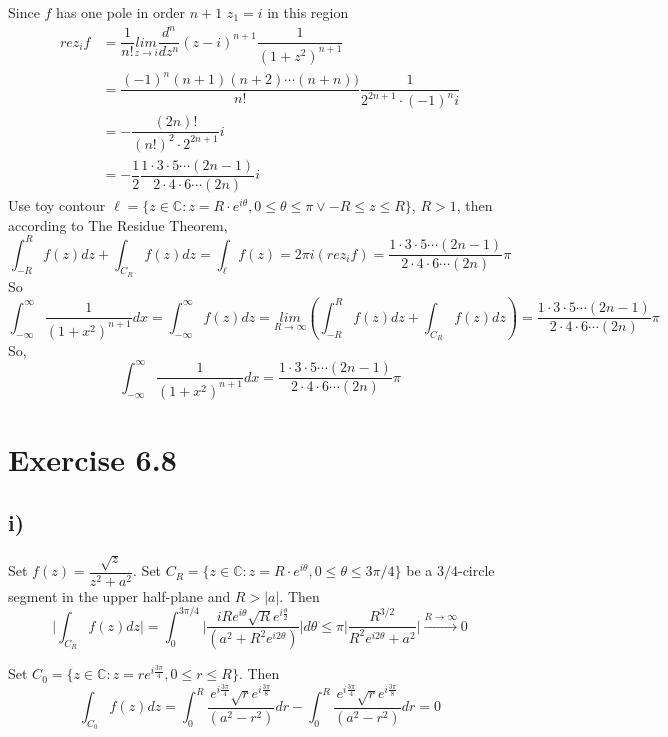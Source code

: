 \documentclass[a4paper,12pt,titlepage]{article}
\begin{document}
Since $f$ has one pole in order $n+1$ $z_1=i$ in this region
\begin{align*}
rez_{i}f&=\dfrac{1}{n!}\underset{z\rightarrow i}{lim}\dfrac{d^{n}}{dz^n}
(z-i)^{n+1}\dfrac{1}{(1+z^2)^{n+1}}\\
&=\dfrac{(-1)^{n}(n+1)(n+2)\cdots(n+n))}{n!}\dfrac{1}{2^{2n+1}\cdot(-1)^{n}i}\\
&=-\dfrac{(2n)!}{(n!)^2\cdot2^{2n+1}}i
\\
&=-\dfrac{1}{2}\dfrac{1\cdot3\cdot5\cdots(2n-1)}{2\cdot4\cdot6\cdots(2n)}i
\end{align*}
Use toy contour $\ell= \lbrace z \in \mathbb{C}: z = R\cdot e^{i\theta}, 0 \leqslant \theta \leqslant \pi \vee -R\leqslant z\leqslant R\rbrace$, $R>1$, then according to The Residue Theorem, 
$$\int_{-R}^Rf(z)dz+\int_{C_R}f(z)dz=\int_{\ell}f(z)=2\pi i(rez_{i}f)=\dfrac{1\cdot3\cdot5\cdots(2n-1)}{2\cdot4\cdot6\cdots(2n)}\pi$$
So
$$\int_{-\infty}^{\infty}\dfrac{1}{(1+x^2)^{n+1}}dx=\int_{-\infty}^{\infty}f(z)dz=\underset{R\rightarrow \infty}{lim}(\int_{-R}^Rf(z)dz+\int_{C_R}f(z)dz)=\dfrac{1\cdot3\cdot5\cdots(2n-1)}{2\cdot4\cdot6\cdots(2n)}\pi$$
So,
$$\int_{-\infty}^{\infty}\dfrac{1}{(1+x^2)^{n+1}}dx=\dfrac{1\cdot3\cdot5\cdots(2n-1)}{2\cdot4\cdot6\cdots(2n)}\pi
$$

\section*{Exercise 6.8}
\subsection*{i)}
Set $f(z)=\dfrac{\sqrt{z}}{z^2+a^2}$. 
Set $C_R = \lbrace z \in \mathbb{C}: z = R\cdot e^{i\theta}, 0 \leqslant \theta \leqslant 3\pi/4\rbrace$ be a $3/4$-circle segment in the upper half-plane and $R>|a|$.  Then
$$\Big|\int_{C_R}f(z)dz\Big|=\int_0^{3\pi/4}\Big|\dfrac{iRe^{i\theta}\sqrt{R}e^{i\frac{\theta}{2}}}{(a^2+R^2e^{i2\theta})}\Big|d\theta\leqslant\pi\Big|\dfrac{R^{3/2}}{R^2e^{i2\theta}+a^2}\Big|\xrightarrow{R\rightarrow\infty}0$$

Set $C_0 = \lbrace z \in \mathbb{C}: z = r e^{i\frac{3\pi}{4}}, 0 \leqslant r\leqslant R\rbrace$.  Then
$$\int_{C_0}f(z)dz=\int_0^{R}\dfrac{e^{i\frac{3\pi}{4}}\sqrt{r}e^{i\frac{3\pi}{8}}}{(a^2-r^2)}dr-\int_0^{R}\dfrac{e^{i\frac{3\pi}{4}}\sqrt{r}e^{i\frac{3\pi}{8}}}{(a^2-r^2)}dr=0$$
\end{document}
